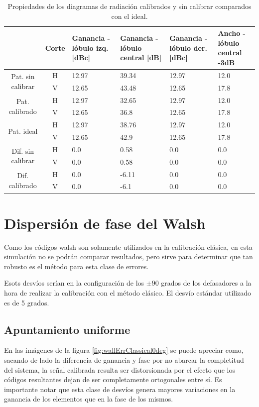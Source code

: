 \begin{table}[H]
  \footnotesize
  \centering
  \begin{tabular}{|c|c|p{2cm}|p{2.5cm}|p{2.5cm}|p{2.5cm}|}
    \cline{2-6}
    \multicolumn{1}{c|}{} & Corte & Ganancia - lóbulo izq. [dBc] & Ganancia - lóbulo central [dB] &
    Ganancia - lóbulo der. [dBc] & Ancho - lóbulo central -3dB \tabularnewline\hline
    \multirow{2}{2cm}{Pat. sin calibrar} & H & 12.97 & 39.34 & 12.97 & 12.0 \tabularnewline\cline{2-6}
     & V & 12.65 & 43.48 & 12.65 & 17.8 \tabularnewline\hline
    \multirow{2}{2cm}{Pat. calibrado} & H & 12.97 & 32.65 & 12.97 & 12.0 \tabularnewline\cline{2-6}
     & V & 12.65 & 36.8 & 12.65 & 17.8 \tabularnewline\hline
    \multirow{2}{2cm}{Pat. ideal} & H & 12.97 & 38.76 & 12.97 & 12.0 \tabularnewline\cline{2-6}
     & V & 12.65 & 42.9 & 12.65 & 17.8 \tabularnewline\hline
    \multirow{2}{2cm}{Dif. sin calibrar} & H & 0.0 & 0.58 & 0.0 & 0.0\tabularnewline\cline{2-6}
     & V & 0.0 & 0.58 & 0.0 & 0.0 \tabularnewline\hline
    \multirow{2}{2cm}{Dif. calibrado} & H & 0.0 & -6.11 & 0.0 & 0.0 \tabularnewline\cline{2-6}
     & V & 0.0 & -6.1 & 0.0 & 0.0 \tabularnewline\hline
  \end{tabular}
  \caption{Propiedades de los diagramas de radiación calibrados y sin calibrar comparados con el ideal.}
  \label{tab:chirpRepErrClassical10degRow}
\end{table}


\section{Dispersión de fase del Walsh}

Como los códigos walsh son solamente utilizados en la calibración clásica, en esta simulación no se podrán comparar 
resultados, pero sirve para determinar que tan robusto es el método para esta clase de errores. 

Esots desvíos serían en la configuración de los $\pm 90$ grados de los defasadores a la hora de realizar la calibración con 
el método clásico. El desvío estándar utilizado es de 5 grados. 

\subsection{Apuntamiento uniforme}

En las imágenes de la figura \ref{fig:wallErrClassical0deg} se puede apreciar como, sacando de lado la diferencia de ganancia 
y fase por no abarcar la completitud del sistema, la señal calibrada resulta ser distorsionada por el efecto que los códigos 
resultantes dejan de ser completamente ortogonales entre sí. Es importante notar que esta clase de desvíos genera mayores 
variaciones en la ganancia de los elementos que en la fase de los mismos.

